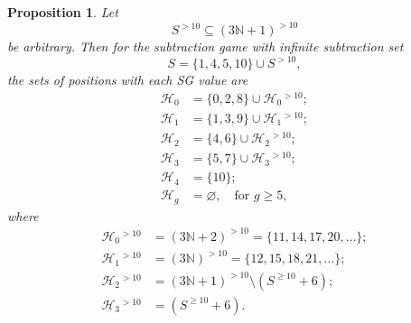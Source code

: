 \documentclass[10pt,a4paper]{amsart}
\newtheorem{proposition}{Proposition}
\begin{document}
\begin{proposition}\label{main_prop}
    Let
    \[
        S^{>10} \subseteq (3\mathbb{N}+1)^{>10}
    \]
    be arbitrary.
    Then for the subtraction game with infinite subtraction set
    \[
        S=\{1, 4, 5, 10\} \cup S^{>10},
    \]
    the sets of positions with each SG value are
    \begin{align*}
        \mathcal{H}_0 &= \{0, 2, 8\} \cup \mathcal{H}_0{}^{>10}; \\
        \mathcal{H}_1 &= \{1, 3, 9\} \cup \mathcal{H}_1{}^{>10}; \\
        \mathcal{H}_2 &= \{4, 6\} \cup \mathcal{H}_2{}^{>10}; \\
        \mathcal{H}_3 &= \{5, 7\} \cup \mathcal{H}_3{}^{>10}; \\
        \mathcal{H}_4 &= \{10\}; \\
        \mathcal{H}_g &= \varnothing, \quad \text{for } g\geq 5,
    \end{align*}
    where
    \begin{align*}
        \mathcal{H}_0{}^{>10} &= (3\mathbb{N}+2)^{>10} = \{11, 14, 17, 20,\ldots\}; \\
        \mathcal{H}_1{}^{>10} &= (3\mathbb{N})^{>10} = \{12, 15, 18, 21,\ldots\}; \\
        \mathcal{H}_2{}^{>10} &= (3\mathbb{N}+1)^{>10} \setminus (S^{\geq 10}+6); \\
        \mathcal{H}_3{}^{>10} &= (S^{\geq 10}+6).
    \end{align*}
\end{proposition}
\end{document}
